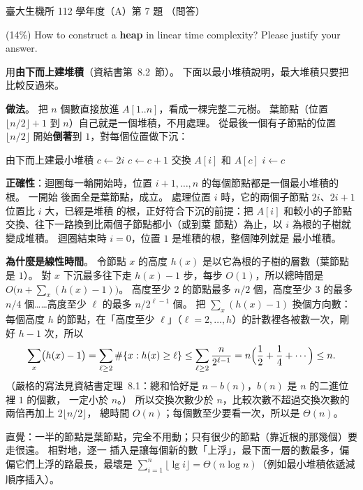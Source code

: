 \begin{pastexam}[label={px:ntu-112-bime-ds-07}]{臺大生機所 112 學年度（A）第 7 題}
（問答）

(14\%) How to construct a \textbf{heap} in linear time complexity? Please justify your answer.
\end{pastexam}

\begin{pastsoln}
用\textbf{由下而上建堆積}（資結書第~8.2~節）。 下面以最小堆積說明，最大堆積只要把比較反過來。

\textbf{做法}。 把 $n$ 個數直接放進 $A[1..n]$，看成一棵完整二元樹。 葉節點（位置
$\lfloor n/2 \rfloor + 1$ 到 $n$）自己就是一個堆積，不用處理。 從最後一個有子節點的位置
$\lfloor n/2 \rfloor$ 開始\textbf{倒著}到 $1$，對每個位置做下沉：
\begin{pseudo}{由下而上建最小堆積}
        \State {}
    \EndFor
\EndProcedure
{}
        \State $c \gets 2i$ 
            \State $c \gets c + 1$ 
        \EndIf
            \State \Return
        \EndIf
        \State 交換 $A[i]$ 和 $A[c]$
        \State $i \gets c$
    \EndWhile
\EndProcedure
\end{pseudo}

\textbf{正確性}：迴圈每一輪開始時，位置 $i + 1, \ldots, n$ 的每個節點都是一個最小堆積的根。 一開始
後面全是葉節點，成立。 處理位置 $i$ 時，它的兩個子節點 $2i$、$2i + 1$ 位置比 $i$ 大，已經是堆積
的根，正好符合下沉的前提：把 $A[i]$ 和較小的子節點交換、往下一路換到比兩個子節點都小（或到葉
節點）為止，以 $i$ 為根的子樹就變成堆積。 迴圈結束時 $i = 0$，位置 $1$ 是堆積的根，整個陣列就是
最小堆積。

\textbf{為什麼是線性時間}。 令節點 $x$ 的高度 $h(x)$ 是以它為根的子樹的層數（葉節點是 $1$）。
對 $x$ 下沉最多往下走 $h(x) - 1$ 步，每步 $O(1)$，所以總時間是
$O\bigl(n + \sum_x (h(x) - 1)\bigr)$。 高度至少 $2$ 的節點最多 $n/2$ 個，高度至少 $3$ 的最多
$n/4$ 個……高度至少 $\ell$ 的最多 $n/2^{\ell - 1}$ 個。 把 $\sum_x (h(x) - 1)$ 換個方向數：
每個高度 $h$ 的節點，在「高度至少 $\ell$」（$\ell = 2, \ldots, h$）的計數裡各被數一次，剛好
$h - 1$ 次，所以
\[
\sum_x \bigl(h(x) - 1\bigr) = \sum_{\ell \ge 2} \#\{x : h(x) \ge \ell\}
\le \sum_{\ell \ge 2} \frac{n}{2^{\ell - 1}} = n\Bigl(\frac12 + \frac14 + \cdots\Bigr) \le n .
\]
（嚴格的寫法見資結書定理~8.1：總和恰好是 $n - b(n)$，$b(n)$ 是 $n$ 的二進位裡 $1$ 的個數，
一定小於 $n$。） 所以交換次數少於 $n$，比較次數不超過交換次數的兩倍再加上 $2\lfloor n/2 \rfloor$，
總時間 $O(n)$；每個數至少要看一次，所以是 $\Theta(n)$。

直覺：一半的節點是葉節點，完全不用動；只有很少的節點（靠近根的那幾個）要走很遠。 相對地，逐一
插入是讓每個新的數「上浮」，最下面一層的數最多，偏偏它們上浮的路最長，最壞是
$\sum_{i=1}^{n} \lfloor \lg i \rfloor = \Theta(n \log n)$（例如最小堆積依遞減順序插入）。
\end{pastsoln}
